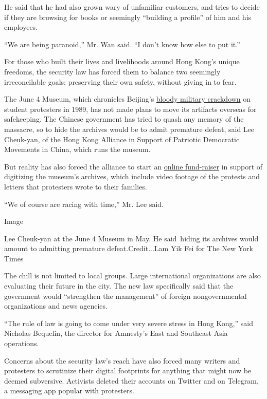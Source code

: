He said that he had also grown wary of unfamiliar customers, and tries
to decide if they are browsing for books or seemingly ``building a
profile'' of him and his employees.

``We are being paranoid,'' Mr. Wan said. ``I don't know how else to put
it.''

For those who built their lives and livelihoods around Hong Kong's
unique freedoms, the security law has forced them to balance two
seemingly irreconcilable goals: preserving their own safety, without
giving in to fear.

The June 4 Museum, which chronicles Beijing's
\href{https://www.nytimes3xbfgragh.onion/2019/06/03/world/asia/tiananmen-massacre-anniversary-archive.html}{bloody
military crackdown} on student protesters in 1989, has not made plans to
move its artifacts overseas for safekeeping. The Chinese government has
tried to quash any memory of the massacre, so to hide the archives would
be to admit premature defeat, said Lee Cheuk-yan, of the Hong Kong
Alliance in Support of Patriotic Democratic Movements in China, which
runs the museum.

But reality has also forced the alliance to start an
\href{https://www.kickstarter.com/projects/64museum/june-4th-museum-of-memory-and-human-rights?ref=discovery\&term=\%E5\%85\%AD\%E5\%9B\%9B}{online
fund-raiser} in support of digitizing the museum's archives, which
include video footage of the protests and letters that protesters wrote
to their families.

``We of course are racing with time,'' Mr. Lee said.

Image

Lee Cheuk-yan at the June 4 Museum in May. He said~hiding its archives
would amount to admitting premature defeat.Credit...Lam Yik Fei for The
New York Times

The chill is not limited to local groups. Large international
organizations are also evaluating their future in the city. The new law
specifically said that the government would ``strengthen the
management'' of foreign nongovernmental organizations and news agencies.

``The rule of law is going to come under very severe stress in Hong
Kong,'' said Nicholas Bequelin, the director for Amnesty's East and
Southeast Asia operations.

Concerns about the security law's reach have also forced many writers
and protesters to scrutinize their digital footprints for anything that
might now be deemed subversive. Activists deleted their accounts on
Twitter and on Telegram, a messaging app popular with protesters.

